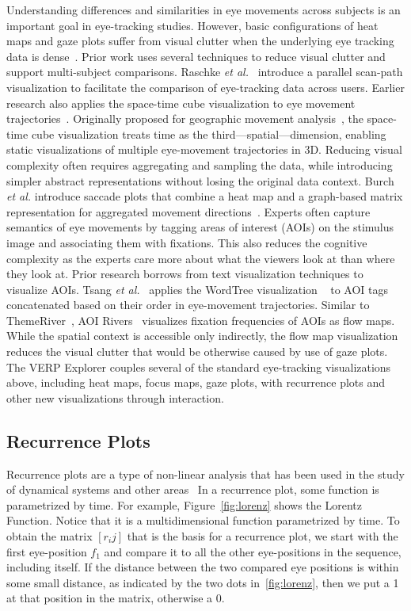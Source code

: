\documentclass{sigchi}
\newcommand{\etal}{\textit{et al.}\xspace}
\begin{document}
Understanding differences and similarities in eye movements across subjects
is an important goal in eye-tracking studies. However, basic configurations
of heat maps and gaze plots suffer from visual clutter when the underlying
eye tracking data is dense~\cite{Blascheck_2014}. Prior work uses several
techniques to reduce visual clutter and support multi-subject comparisons.
Raschke \etal ~\cite{Raschke_2012} introduce a parallel scan-path
visualization to facilitate the comparison of eye-tracking data across
users.  Earlier research also applies the space-time cube visualization to
eye movement trajectories~\cite{Li_2010,Kurzhals_2013}. Originally proposed
for geographic movement analysis~\cite{Hagerstrand_1970,Kraak_2003}, the
space-time cube visualization treats time as the third—spatial—dimension,
enabling static visualizations of multiple eye-movement trajectories in 3D.
Reducing visual complexity often requires aggregating and sampling the
data, while introducing simpler abstract representations without losing the
original data context.  Burch \etal introduce saccade plots that combine
a heat map  and a graph-based matrix representation for aggregated movement
directions~\cite{Burch_2014b}. Experts often capture semantics of eye
movements by tagging areas of interest (AOIs) on the stimulus image and
associating them with fixations.  This also reduces the cognitive
complexity as the experts care more about what the viewers look at than
where they look at. Prior research borrows from text visualization
techniques to visualize AOIs. Tsang \etal~\cite{Tsang_2010} applies the
WordTree visualization ~\cite{Wattenberg_2008} to AOI tags concatenated
based on their order in eye-movement trajectories. Similar to
ThemeRiver~\cite{Havre_2000}, AOI Rivers~\cite{Burch_2013} visualizes
fixation frequencies of AOIs as flow maps. While the spatial context is
accessible only indirectly, the flow map visualization reduces the visual
clutter that would be otherwise caused by use of gaze plots. The VERP
Explorer couples several of the standard eye-tracking visualizations above,
including heat maps, focus maps, gaze plots, with recurrence plots and
other new visualizations through interaction. 
	
\pagebreak	

\subsection{Recurrence Plots} 
Recurrence  plots are a type of non-linear
analysis that has been used in the study of dynamical systems and other
areas~\cite{Eckmann_1987,Marwan_2008} In a recurrence plot, some
function is parametrized by time.  For example, Figure~\ref{fig:lorenz} 
shows the Lorentz Function. Notice that it is a multidimensional function
parametrized by time. To obtain the matrix $[r_ij]$ that is the basis for
a recurrence plot, we start with the first eye-position $f_1$  and compare
it to all the other eye-positions in the sequence, including itself. If the
distance  between the two compared eye positions is within some small
distance, as indicated by the two dots in~\ref{fig:lorenz}, then we 
put a 1 at that position in the matrix, otherwise a 0. 
\end{document}
